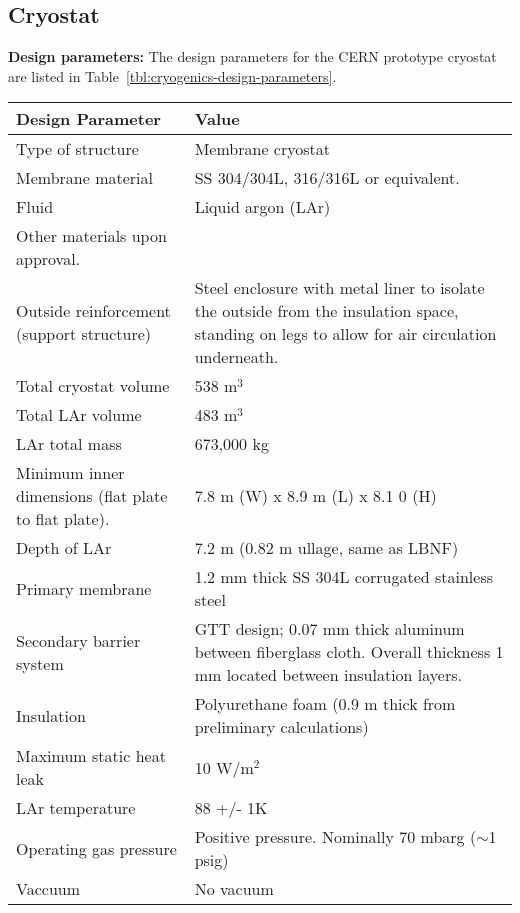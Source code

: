 \label{appendix}
\subsection*{Cryostat}


\textbf{Design parameters:} 
The design parameters for the CERN prototype cryostat are listed in Table~\ref{tbl:cryogenics-design-parameters}.\\

\begin{table}[htpb]
\centering
\begin{tabular}{|p{}|p{}|}
\hline
\textbf{Design Parameter} & \textbf{Value} \\ \hline
Type of structure & Membrane cryostat \\ \hline
Membrane material    &  SS 304/304L, 316/316L or equivalent. \\ \hline
Fluid & Liquid argon (LAr)  \\ \hline
Other materials upon approval.\\ \hline
 Outside reinforcement (support structure)  &  Steel enclosure with metal liner to isolate the outside from the insulation space, standing on legs to allow for air circulation underneath. \\ \hline
 Total cryostat volume  &  538 m$^3$ \\ \hline
 Total LAr volume  &  483 m$^3$ \\ \hline
LAr total mass   & 673,000 kg  \\ \hline
Minimum inner dimensions (flat plate to flat plate).   &  7.8 m (W) x 8.9 m (L) x 8.1 0 (H) \\ \hline
Depth of LAr   &  7.2 m (0.82 m ullage, same as LBNF) \\ \hline
Primary membrane   &   1.2 mm thick SS 304L corrugated stainless steel\\ \hline
Secondary barrier system   &  GTT design; 0.07 mm thick aluminum between fiberglass cloth. Overall thickness 1 mm located between insulation layers.  \\ \hline
 Insulation  &  Polyurethane foam (0.9 m thick from preliminary calculations) \\ \hline
Maximum static heat leak   &  10 W/m$^2$ \\ \hline
LAr temperature   & 88 +/- 1K  \\ \hline
Operating gas pressure   &  Positive pressure. Nominally 70 mbarg ($\sim$1 psig) \\ \hline
 Vaccuum  &  No vacuum \\ \hline

\end{tabular}
\end{table}
